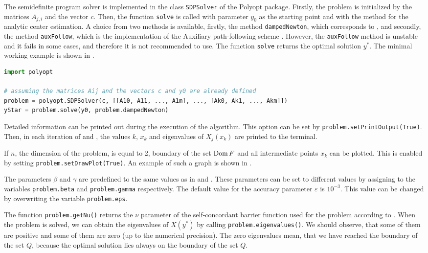 The semidefinite program solver is implemented in the class \texttt{SDPSolver} of the Polyopt package. Firstly, the problem is initialized by the matrices $A_{j,i}$ and the vector $c$.
Then, the function \texttt{solve} is called with parameter $y_0$ as the starting point and with the method for the analytic center estimation.
A choice from two methods is available, firstly, the method \texttt{dampedNewton}, which corresponds to , and secondly, the method \texttt{auxFollow}, which is the implementation of the Auxiliary path-following scheme \cite{Nesterov-2004}. 
However, the \texttt{auxFollow} method is unstable and it fails in some cases, and therefore it is not recommended to use.
The function \texttt{solve} returns the optimal solution $y^*$.
The minimal working example is shown in .
\begin{lstlisting}[language=python, caption={Typical usage of the class \texttt{SDPSolver} of the Polyopt package.}, labellis={SDP:imp:usage}]
import polyopt

# assuming the matrices Aij and the vectors c and y0 are already defined
problem = polyopt.SDPSolver(c, [[A10, A11, ..., A1m], ..., [Ak0, Ak1, ..., Akm]])
yStar = problem.solve(y0, problem.dampedNewton)
\end{lstlisting}

Detailed information can be printed out during the execution of the algorithm.
This option can be set by \texttt{problem.setPrintOutput(True)}.
Then, in each iteration of  and , the values $k$, $x_k$ and eigenvalues of $X_j(x_k)$ are printed to the terminal.

If $n$, the dimension of the problem, is equal to 2, boundary of the set $\operatorname{Dom} F$  and all intermediate points $x_k$ can be plotted.
This is enabled by setting \texttt{problem.setDrawPlot(True)}.
An example of such a graph is shown in .

The parameters $\beta$ and $\gamma$ are predefined to the same values as in  and .
These parameters can be set to different values by assigning to the variables \texttt{problem.beta} and \texttt{problem.gamma} respectively.
The default value for the accuracy parameter $\varepsilon$ is $10^{-3}$.
This value can be changed by overwriting the variable \texttt{problem.eps}.

The function \texttt{problem.getNu()} returns the $\nu$ parameter of the self-concordant barrier function used for the problem according to .
When the problem is solved, we can obtain the eigenvalues of $X(y^*)$ by calling \texttt{problem.eigenvalues()}.
We should observe, that some of them are positive and some of them are zero (up to the numerical precision).
The zero eigenvalues mean, that we have reached the boundary of the set $Q$, because the optimal solution lies always on the boundary of the set $Q$.

